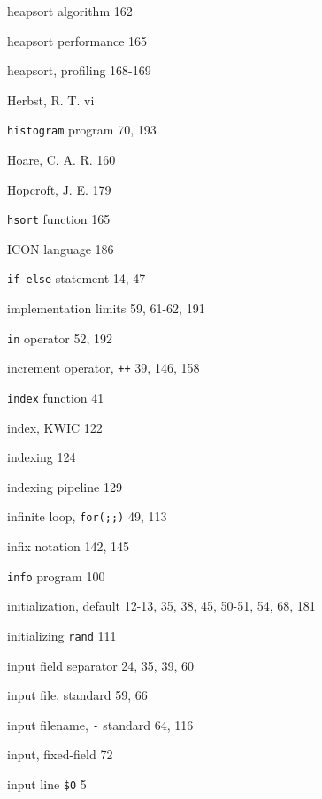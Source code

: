 \begin{multicols}{3}
\hangindent=3pc  heapsort algorithm 162

\hangindent=3pc  heapsort performance 165

\hangindent=3pc  heapsort, profiling 168-169

\hangindent=3pc  Herbst, R. T. vi

\hangindent=3pc  \verb'histogram' program 70, 193

\hangindent=3pc  Hoare, C. A. R. 160

\hangindent=3pc  Hopcroft, J. E. 179

\hangindent=3pc  \verb'hsort' function 165

\hangindent=3pc  ICON language 186

\hangindent=3pc  \verb'if-else' statement 14, 47

\hangindent=3pc  implementation limits 59, 61-62, 191

\hangindent=3pc  \verb'in' operator 52, 192

\hangindent=3pc  increment operator, \verb'++' 39, 146, 158

\hangindent=3pc  \verb'index' function 41

\hangindent=3pc  index, KWIC 122

\hangindent=3pc  indexing 124

\hangindent=3pc  indexing pipeline 129

\hangindent=3pc  infinite loop, \verb'for(;;)' 49, 113

\hangindent=3pc  infix notation 142, 145

\hangindent=3pc  \verb'info' program 100

\hangindent=3pc  initialization, default 12-13, 35, 38, 45, 50-51, 54, 68, 181

\hangindent=3pc  initializing \verb'rand' 111

\hangindent=3pc  input field separator 24, 35, 39, 60

\hangindent=3pc  input file, standard 59, 66

\hangindent=3pc  input filename, \verb'-' standard 64, 116

\hangindent=3pc  input, fixed-field 72

\hangindent=3pc  input line \verb'$0' 5


\end{multicols}
